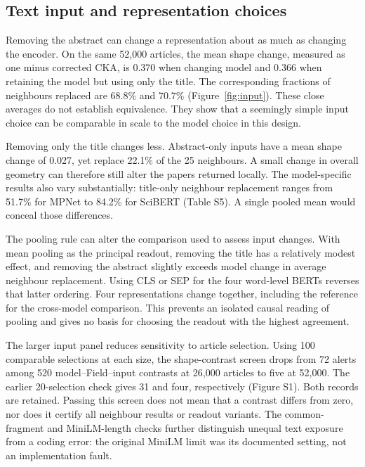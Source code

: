 \documentclass[12pt]{article}
\begin{document}
\subsection{Text input and representation choices}
Removing the abstract can change a representation about as much as changing the encoder. On the same 52,000 articles, the mean shape change, measured as one minus corrected CKA, is 0.370 when changing model and 0.366 when retaining the model but using only the title. The corresponding fractions of neighbours replaced are 68.8\% and 70.7\% (Figure~\ref{fig:input}). These close averages do not establish equivalence. They show that a seemingly simple input choice can be comparable in scale to the model choice in this design.


Removing only the title changes less. Abstract-only inputs have a mean shape change of 0.027, yet replace 22.1\% of the 25 neighbours. A small change in overall geometry can therefore still alter the papers returned locally. The model-specific results also vary substantially: title-only neighbour replacement ranges from 51.7\% for MPNet to 84.2\% for SciBERT (Table S5). A single pooled mean would conceal those differences.

The pooling rule can alter the comparison used to assess input changes. With mean pooling as the principal readout, removing the title has a relatively modest effect, and removing the abstract slightly exceeds model change in average neighbour replacement. Using CLS or SEP for the four word-level BERTs reverses that latter ordering. Four representations change together, including the reference for the cross-model comparison. This prevents an isolated causal reading of pooling and gives no basis for choosing the readout with the highest agreement.

The larger input panel reduces sensitivity to article selection. Using 100 comparable selections at each size, the shape-contrast screen drops from 72 alerts among 520 model--Field--input contrasts at 26,000 articles to five at 52,000. The earlier 20-selection check gives 31 and four, respectively (Figure S1). Both records are retained. Passing this screen does not mean that a contrast differs from zero, nor does it certify all neighbour results or readout variants. The common-fragment and MiniLM-length checks further distinguish unequal text exposure from a coding error: the original MiniLM limit was its documented setting, not an implementation fault.
\end{document}
